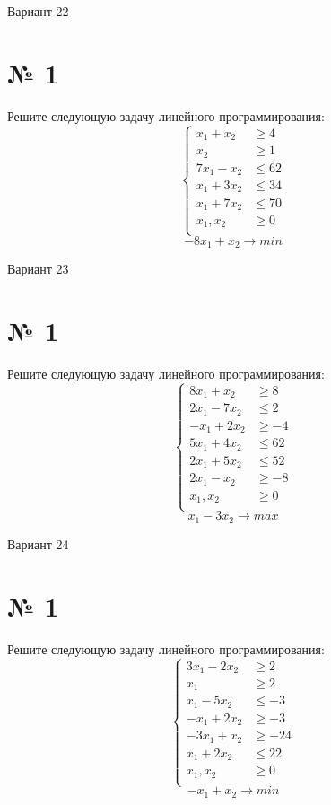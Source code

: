 \documentclass{article}%
\begin{document}
%
\newpage%
\begin{center}%
\begin{Huge}%
Вариант 22%
\end{Huge}%
\end{center}%
\section*{№ 1}%
\label{sec:1}%
Решите следующую задачу линейного программирования: %
\[%
\left\{\begin{aligned}x_{1}+x_{2} & \ge4 \\x_{2} & \ge1 \\7x_{1}-x_{2} & \le62 \\x_{1}+3x_{2} & \le34 \\x_{1}+7x_{2} & \le70 \\x_{1},x_{2} & \ge 0 \\\end{aligned}\right.%
\]%
\[%
-8x_{1}+x_{2}  \to min%
\]

%
\newpage%
\begin{center}%
\begin{Huge}%
Вариант 23%
\end{Huge}%
\end{center}%
\section*{№ 1}%
\label{sec:1}%
Решите следующую задачу линейного программирования: %
\[%
\left\{\begin{aligned}8x_{1}+x_{2} & \ge8 \\2x_{1}-7x_{2} & \le2 \\-x_{1}+2x_{2} & \ge-4 \\5x_{1}+4x_{2} & \le62 \\2x_{1}+5x_{2} & \le52 \\2x_{1}-x_{2} & \ge-8 \\x_{1},x_{2} & \ge 0 \\\end{aligned}\right.%
\]%
\[%
x_{1}-3x_{2}  \to max%
\]

%
\newpage%
\begin{center}%
\begin{Huge}%
Вариант 24%
\end{Huge}%
\end{center}%
\section*{№ 1}%
\label{sec:1}%
Решите следующую задачу линейного программирования: %
\[%
\left\{\begin{aligned}3x_{1}-2x_{2} & \ge2 \\x_{1} & \ge2 \\x_{1}-5x_{2} & \le-3 \\-x_{1}+2x_{2} & \ge-3 \\-3x_{1}+x_{2} & \ge-24 \\x_{1}+2x_{2} & \le22 \\x_{1},x_{2} & \ge 0 \\\end{aligned}\right.%
\]%
\[%
-x_{1}+x_{2}  \to min%
\]
\end{document}
